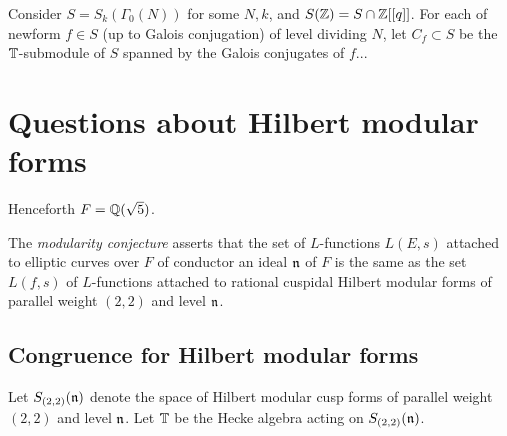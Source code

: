 \documentclass{article}
\begin{document}
Consider $S=S_k(\Gamma_0(N))$ for some $N,k$, and $S(\mathbb{Z})=S\cap
\mathbb{Z}[[q]]$.  For each of newform $f\in S$ (up to Galois conjugation) of
level dividing $N$, let $C_f \subset S$ be the $\mathbb{T}$-submodule of $S$
spanned by the Galois conjugates of $f$...



\section{Questions about Hilbert modular forms}

Henceforth $F=\mathbb{Q}(\sqrt{5})$.

The {\em modularity conjecture} asserts that the set of $L$-functions
$L(E,s)$ attached to elliptic curves over $F$ of conductor an ideal
$\mathfrak{n}$ of $F$ is the same as the set $L(f,s)$ of $L$-functions attached
to rational cuspidal Hilbert modular forms of parallel weight $(2,2)$
and level $\mathfrak{n}$.



\subsection{Congruence for Hilbert modular forms}

Let $S_{(2,2)}(\mathfrak{n})$ denote the space of Hilbert modular cusp forms of
parallel weight $(2,2)$ and level $\mathfrak{n}$.  Let $\mathbb{T}$ be the Hecke algebra
acting on $S_{(2,2)}(\mathfrak{n})$.  
\end{document}
